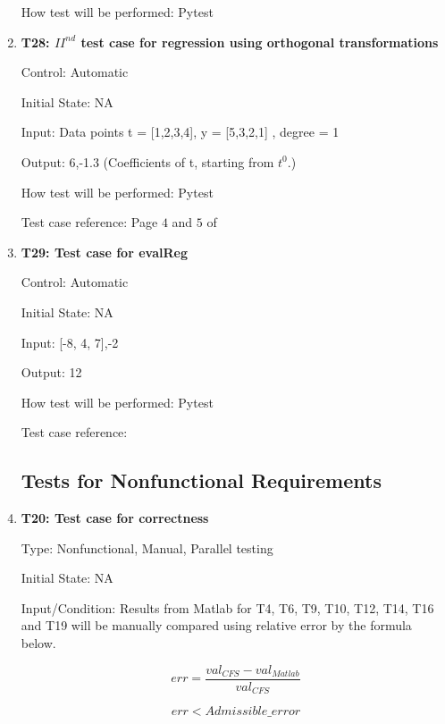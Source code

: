 \documentclass[12pt, titlepage]{article}
\begin{document}
\begin{enumerate}
How test will be performed: Pytest\\


\item{\textbf{T28: ${II}^{nd}$ test case for regression using orthogonal 
transformations}\\}

Control: Automatic

Initial State: NA

Input: Data points t = [1,2,3,4], y = [5,3,2,1] , degree = 1

Output: 6,-1.3 (Coefficients of t, starting from $t^{0}$.)

How test will be performed: Pytest

Test case reference: Page $4$ and $5$ of \cite{RegOrthogonal}\\

\item{\textbf{T29: Test case for evalReg}}

Control: Automatic

Initial State: NA

Input: [-8, 4, 7],-2

Output: 12

How test will be performed: Pytest

Test case reference: \cite{RegAugmented}\\



\subsection{Tests for Nonfunctional Requirements}\label{NFRTesting}



\item{\textbf{T20: Test case for correctness}\\}

Type: Nonfunctional, Manual, Parallel testing
					
Initial State: NA
					
Input/Condition: Results from Matlab for T4, T6, T9, T10, T12, T14, T16 and T19 will be manually compared using relative error by the formula below.

\begin{equation*}
err = \frac{val_{CFS} - val_{Matlab}}{val_{CFS}}
\end{equation*}

\begin{equation*}
err < Admissible\_error
\end{equation*}


\end{enumerate}
\end{document}
